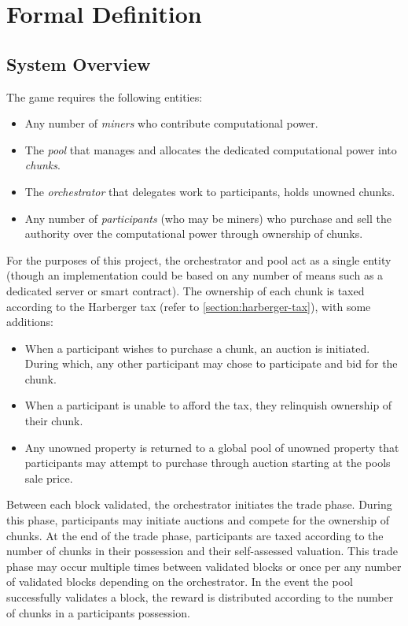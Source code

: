 \chapter{Formal Definition}

\section{System Overview}

The game requires the following entities:

\begin{itemize}
    \item Any number of \textit{miners} who contribute computational power.
    \item The \textit{pool} that manages and allocates the dedicated computational power into \textit{chunks}.
    \item The \textit{orchestrator} that delegates work to participants, holds unowned chunks.
    \item Any number of \textit{participants} (who may be miners) who purchase and sell the authority over the computational power through ownership of chunks.
\end{itemize}
    
For the purposes of this project, the orchestrator and pool act as a single entity (though an implementation could be based on any number of means such as a dedicated server or smart contract). The ownership of each chunk is taxed according to the Harberger tax (refer to \cref{section:harberger-tax}), with some additions: 

\begin{itemize}
    \item When a participant wishes to purchase a chunk, an auction is initiated. During which, any other participant may chose to participate and bid for the chunk.
    \item When a participant is unable to afford the tax, they relinquish ownership of their chunk. 
    \item Any unowned property is returned to a global pool of unowned property that participants may attempt to purchase through auction starting at the pools sale price.
\end{itemize}

Between each block validated, the orchestrator initiates the trade phase. During this phase, participants may initiate auctions and compete for the ownership of chunks. At the end of the trade phase, participants are taxed according to the number of chunks in their possession and their self-assessed valuation. This trade phase may occur multiple times between validated blocks or once per any number of validated blocks depending on the orchestrator. In the event the pool successfully validates a block, the reward is distributed according to the number of chunks in a participants possession.




